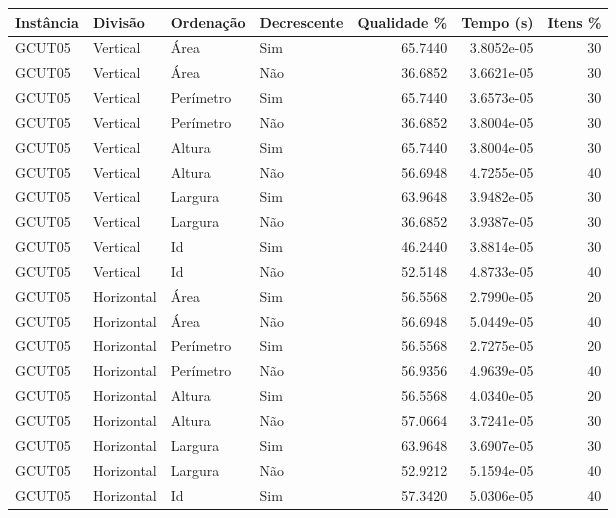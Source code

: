 \begin{tabular}{llllrrr}
\hline
Instância & Divisão     & Ordenação & Decrescente & Qualidade \% & Tempo (s)  & Itens \% \\
\hline
GCUT05    & Vertical    & Área      & Sim         & 65.7440      & 3.8052e-05 & 30       \\
GCUT05    & Vertical    & Área      & Não         & 36.6852      & 3.6621e-05 & 30       \\
GCUT05    & Vertical    & Perímetro & Sim         & 65.7440      & 3.6573e-05 & 30       \\
GCUT05    & Vertical    & Perímetro & Não         & 36.6852      & 3.8004e-05 & 30       \\
GCUT05    & Vertical    & Altura    & Sim         & 65.7440      & 3.8004e-05 & 30       \\
GCUT05    & Vertical    & Altura    & Não         & 56.6948      & 4.7255e-05 & 40       \\
GCUT05    & Vertical    & Largura   & Sim         & 63.9648      & 3.9482e-05 & 30       \\
GCUT05    & Vertical    & Largura   & Não         & 36.6852      & 3.9387e-05 & 30       \\
GCUT05    & Vertical    & Id        & Sim         & 46.2440      & 3.8814e-05 & 30       \\
GCUT05    & Vertical    & Id        & Não         & 52.5148      & 4.8733e-05 & 40       \\
GCUT05    & Horizontal  & Área      & Sim         & 56.5568      & 2.7990e-05 & 20       \\
GCUT05    & Horizontal  & Área      & Não         & 56.6948      & 5.0449e-05 & 40       \\
GCUT05    & Horizontal  & Perímetro & Sim         & 56.5568      & 2.7275e-05 & 20       \\
GCUT05    & Horizontal  & Perímetro & Não         & 56.9356      & 4.9639e-05 & 40       \\
GCUT05    & Horizontal  & Altura    & Sim         & 56.5568      & 4.0340e-05 & 20       \\
GCUT05    & Horizontal  & Altura    & Não         & 57.0664      & 3.7241e-05 & 30       \\
GCUT05    & Horizontal  & Largura   & Sim         & 63.9648      & 3.6907e-05 & 30       \\
GCUT05    & Horizontal  & Largura   & Não         & 52.9212      & 5.1594e-05 & 40       \\
GCUT05    & Horizontal  & Id        & Sim         & 57.3420      & 5.0306e-05 & 40       \\

\end{tabular}
